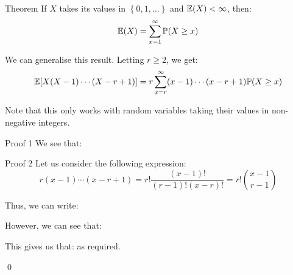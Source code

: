 \documentclass[a4paper]{article}
\begin{document}
\begin{parag}{Theorem}
    If $X$ takes its values in $\left\{0, 1, \ldots\right\}$ and $\exval\left(X\right) < \infty$, then: 
    \[\exval\left(X\right) = \sum_{x=1}^{\infty} \prob\left(X \geq x\right)\]

    We can generalise this result. Letting $r \geq 2$, we get: 
    \[\exval\left[X\left(X-1\right)\cdots\left(X-r+1\right)\right] = r \sum_{x=r}^{\infty} \left(x-1\right)\cdots\left(x-r+1\right)\prob\left(X \geq x\right)\]
    
    Note that this only works with random variables taking their values in non-negative integers.

    \begin{subparag}{Proof 1}
        We see that: 
    \end{subparag}

    \begin{subparag}{Proof 2}
        Let us consider the following expression: 
        \[r\left(x-1\right)\cdots\left(x-r+1\right) = r! \frac{\left(x-1\right)!}{\left(r-1\right)!\left(x-r\right)!} = r! \binom{x-1}{r-1}\]
        
        Thus, we can write: 

        However, we can see that: 
        
        This gives us that:
        as required.

        \qed
    \end{subparag}
\end{parag}
\end{document}
